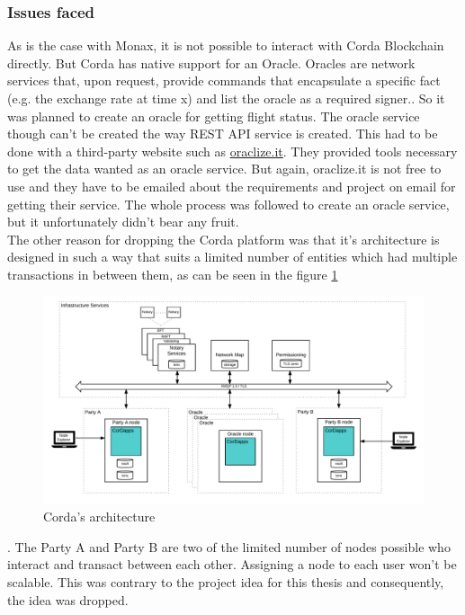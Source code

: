 \subsubsection{Issues faced}
As is the case with Monax, it is not possible to interact with Corda Blockchain directly. But Corda has native support for an Oracle. Oracles are network services that, upon request, provide commands that encapsulate a specific fact (e.g. the exchange rate at time x) and list the oracle as a required signer.\cite{OraclesDocumentation}. So it was planned to create an oracle for getting flight status. The oracle service though can't be created the way REST API service is created. This had to be done with a third-party website such as \url{oraclize.it}. They provided tools necessary to get the data wanted as an oracle service. But again, oraclize.it is not free to use and they have to be emailed about the requirements and project on email for getting their service. The whole process was followed to create an oracle service, but it unfortunately didn't bear any fruit.
\\The other reason for dropping the Corda platform was that it's architecture is designed in such a way that suits a limited number of entities which had multiple transactions in between them, as can be seen in the figure \ref{fig:corda_architecture}
\begin{figure}
    \centering
    \includegraphics[width=\textwidth]{Figures/corda_architecture.png}
    \caption{Corda's architecture \cite{Hearn2016Corda:Ledger}}
    \label{fig:corda_architecture}
\end{figure}.
The Party A and Party B are two of the limited number of nodes possible who interact and transact between each other. Assigning a node to each user won't be scalable. This was contrary to the project idea for this thesis and consequently, the idea was dropped.


